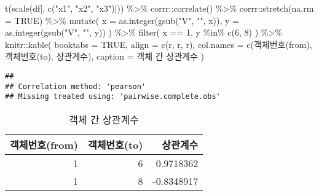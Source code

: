 \documentclass[
]{book}
\newenvironment{Shaded}{\begin{snugshade}}{\end{snugshade}}
\newcommand{\AttributeTok}[1]{\textcolor[rgb]{0.77,0.63,0.00}{#1}}
\newcommand{\ConstantTok}[1]{\textcolor[rgb]{0.00,0.00,0.00}{#1}}
\newcommand{\DecValTok}[1]{\textcolor[rgb]{0.00,0.00,0.81}{#1}}
\newcommand{\FunctionTok}[1]{\textcolor[rgb]{0.00,0.00,0.00}{#1}}
\newcommand{\NormalTok}[1]{#1}
\newcommand{\SpecialCharTok}[1]{\textcolor[rgb]{0.00,0.00,0.00}{#1}}
\newcommand{\StringTok}[1]{\textcolor[rgb]{0.31,0.60,0.02}{#1}}
\begin{document}
\begin{Shaded}
\begin{Highlighting}[]
\FunctionTok{t}\NormalTok{(}\FunctionTok{scale}\NormalTok{(df[, }\FunctionTok{c}\NormalTok{(}\StringTok{"x1"}\NormalTok{, }\StringTok{"x2"}\NormalTok{, }\StringTok{"x3"}\NormalTok{)])) }\SpecialCharTok{\%\textgreater{}\%} 
\NormalTok{  corrr}\SpecialCharTok{::}\FunctionTok{correlate}\NormalTok{() }\SpecialCharTok{\%\textgreater{}\%} 
\NormalTok{  corrr}\SpecialCharTok{::}\FunctionTok{stretch}\NormalTok{(}\AttributeTok{na.rm =} \ConstantTok{TRUE}\NormalTok{) }\SpecialCharTok{\%\textgreater{}\%}
  \FunctionTok{mutate}\NormalTok{(}
    \AttributeTok{x =} \FunctionTok{as.integer}\NormalTok{(}\FunctionTok{gsub}\NormalTok{(}\StringTok{"V"}\NormalTok{, }\StringTok{""}\NormalTok{, x)),}
    \AttributeTok{y =} \FunctionTok{as.integer}\NormalTok{(}\FunctionTok{gsub}\NormalTok{(}\StringTok{"V"}\NormalTok{, }\StringTok{""}\NormalTok{, y))}
\NormalTok{  ) }\SpecialCharTok{\%\textgreater{}\%}
  \FunctionTok{filter}\NormalTok{(}
\NormalTok{    x }\SpecialCharTok{==} \DecValTok{1}\NormalTok{,}
\NormalTok{    y }\SpecialCharTok{\%in\%} \FunctionTok{c}\NormalTok{(}\DecValTok{6}\NormalTok{, }\DecValTok{8}\NormalTok{)}
\NormalTok{  ) }\SpecialCharTok{\%\textgreater{}\%}
\NormalTok{  knitr}\SpecialCharTok{::}\FunctionTok{kable}\NormalTok{(}
    \AttributeTok{booktabs =} \ConstantTok{TRUE}\NormalTok{,}
    \AttributeTok{align =} \FunctionTok{c}\NormalTok{(}\StringTok{\textquotesingle{}r\textquotesingle{}}\NormalTok{, }\StringTok{\textquotesingle{}r\textquotesingle{}}\NormalTok{, }\StringTok{\textquotesingle{}r\textquotesingle{}}\NormalTok{),}
    \AttributeTok{col.names =} \FunctionTok{c}\NormalTok{(}\StringTok{\textquotesingle{}객체번호(from)\textquotesingle{}}\NormalTok{, }\StringTok{\textquotesingle{}객체번호(to)\textquotesingle{}}\NormalTok{, }\StringTok{\textquotesingle{}상관계수\textquotesingle{}}\NormalTok{),}
    \AttributeTok{caption =} \StringTok{\textquotesingle{}객체 간 상관계수\textquotesingle{}}
\NormalTok{  )}
\end{Highlighting}
\end{Shaded}

\begin{verbatim}
## 
## Correlation method: 'pearson'
## Missing treated using: 'pairwise.complete.obs'
\end{verbatim}

\begin{table}

\caption{\label{tab:std-correlation-similarity}객체 간 상관계수}
\centering
\begin{tabular}[t]{rrr}
\toprule
객체번호(from) & 객체번호(to) & 상관계수\\
\midrule
1 & 6 & 0.9718362\\
1 & 8 & -0.8348917\\
\bottomrule
\end{tabular}
\end{table}
\end{document}
